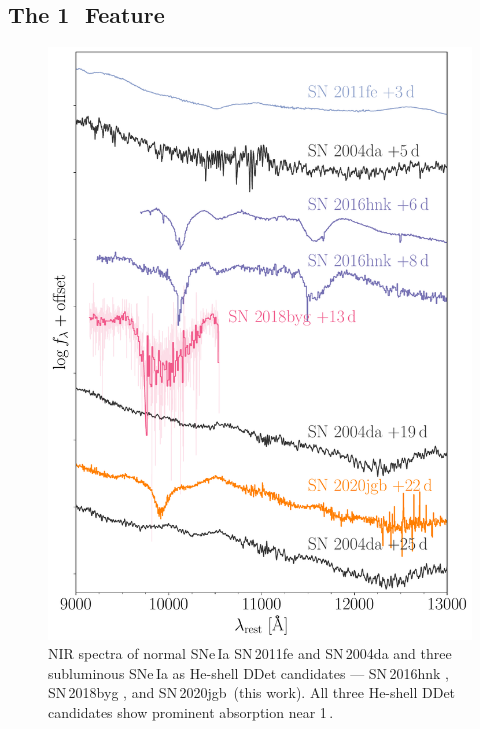\documentclass[twocolumn]{aastex631}
\newcommand{\sn}{SN\,2020jgb}
\begin{document}
\subsection{The 1\,\micron\ Feature} \label{sec:1um}
\begin{figure}
    \centering
    \includegraphics[width=\linewidth]{NIR_spec_comp.pdf}
    \caption{NIR spectra of normal SNe\,Ia SN\,2011fe \citep{Mazzali_2014} and SN\,2004da \citep{Marion2009_NIR} and three subluminous SNe\,Ia  as He-shell DDet candidates --- SN\,2016hnk \citep{galbany_16hnk_2019}, SN\,2018byg \citep{de_18byg_2019}, and \sn\ (this work). All three He-shell DDet candidates show prominent absorption near 1\,\micron.}
    \label{fig:NIR_comp}
\end{figure}
\end{document}
